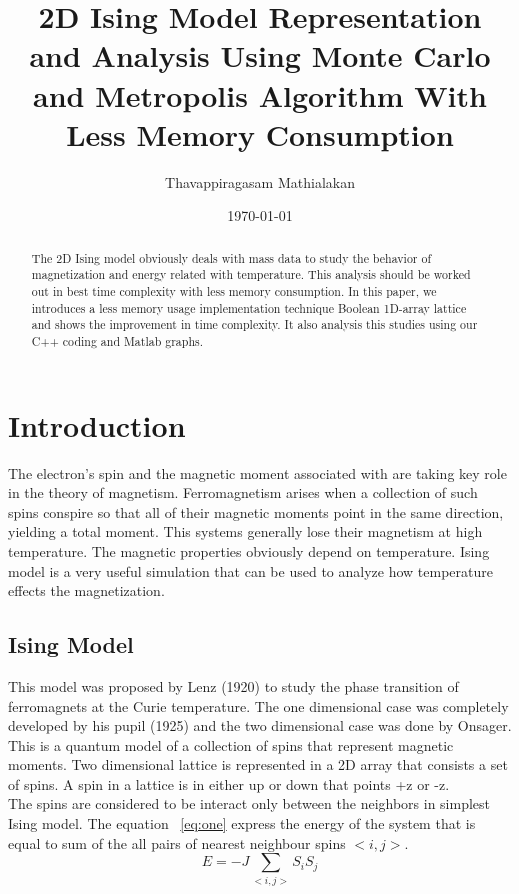 \documentclass[]{article}
\begin{document}
\title{2D Ising Model Representation and Analysis Using Monte Carlo and Metropolis Algorithm With Less Memory Consumption}%
\author{Thavappiragasam Mathialakan}
\date{\today}%
\maketitle

\begin{abstract}
The 2D Ising model obviously deals with mass data to study the behavior of magnetization and energy related with temperature. This analysis should be worked out in best time complexity with less memory consumption. In this paper, we introduces a less memory usage implementation technique Boolean 1D-array lattice and shows the improvement in time complexity. It also analysis this studies using our C++ coding and Matlab graphs. 
\end{abstract}


\section{Introduction} %
\label{sec:level1} %

The electron's spin and the magnetic moment associated with are taking key role in the theory of magnetism. Ferromagnetism arises when a collection of such spins conspire so that all of their magnetic moments point in the same direction, yielding a total moment. This systems generally lose their magnetism at high temperature. The magnetic properties obviously depend on temperature. Ising model is a very useful simulation that can be used to analyze how temperature effects the magnetization.

\subsection{\label{sec:level2.1} Ising Model}
This model was proposed by Lenz (1920) to study the phase transition of ferromagnets at the Curie temperature. The one dimensional case was completely developed by his pupil (1925) and the two dimensional case was done by Onsager. This is a quantum model of a collection of spins that represent magnetic moments. Two dimensional lattice is represented in a 2D array that consists a set of spins. A spin in a lattice is in either up or down that points +z or -z.\\
The spins are considered to be interact only between the neighbors in simplest Ising model. The equation ~\ref{eq:one} express the energy of the system that is equal to sum of the all pairs of nearest neighbour spins $<i, j>$.
\begin{equation}
\label{eq:one}
E = -J \sum_{<i,j>}S_iS_j
\end{equation}
\end{document}
